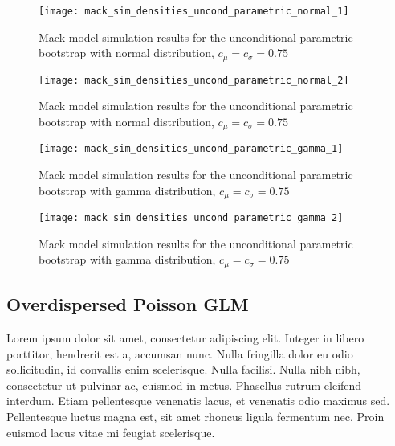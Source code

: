 \documentclass[a4paper]{book}
\begin{document}
\begin{landscape}
  \begin{figure}
    \centering
    \texttt{[image: mack\_sim\_densities\_uncond\_parametric\_normal\_1]}
    \caption{Mack model simulation results for the unconditional parametric bootstrap with normal distribution, $c_\mu = c_\sigma = 0.75$}
    \label{fig:mack-sim-uncond-param-normal}
  \end{figure}
\end{landscape}

\begin{landscape}
  \begin{figure}
    \ContinuedFloat
    \captionsetup{list=off,format=cont}
    \centering
    \texttt{[image: mack\_sim\_densities\_uncond\_parametric\_normal\_2]}
    \caption{Mack model simulation results for the unconditional parametric bootstrap with normal distribution, $c_\mu = c_\sigma = 0.75$}
  \end{figure}
\end{landscape}

\begin{landscape}
  \begin{figure}
    \centering
    \texttt{[image: mack\_sim\_densities\_uncond\_parametric\_gamma\_1]}
    \caption{Mack model simulation results for the unconditional parametric bootstrap with gamma distribution, $c_\mu = c_\sigma = 0.75$}
    \label{fig:mack-sim-uncond-param-gamma}
  \end{figure}
\end{landscape}

\begin{landscape}
  \begin{figure}
    \ContinuedFloat
    \captionsetup{list=off,format=cont}
    \centering
    \texttt{[image: mack\_sim\_densities\_uncond\_parametric\_gamma\_2]}
    \caption{Mack model simulation results for the unconditional parametric bootstrap with gamma distribution, $c_\mu = c_\sigma = 0.75$}
  \end{figure}
\end{landscape}


\restoregeometry

\subsection{Overdispersed Poisson GLM}

Lorem ipsum dolor sit amet, consectetur adipiscing elit. Integer in libero porttitor, hendrerit est a, accumsan nunc. Nulla fringilla dolor eu odio sollicitudin, id convallis enim scelerisque. Nulla facilisi. Nulla nibh nibh, consectetur ut pulvinar ac, euismod in metus. Phasellus rutrum eleifend interdum. Etiam pellentesque venenatis lacus, et venenatis odio maximus sed. Pellentesque luctus magna est, sit amet rhoncus ligula fermentum nec. Proin euismod lacus vitae mi feugiat scelerisque.
\end{document}
